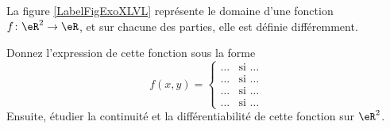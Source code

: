 
\begin{exercice}\label{exo0045}

La figure \ref{LabelFigExoXLVL} représente le domaine d'une fonction $f\colon \eR^2\to \eR$, et sur chacune des parties, elle est définie différemment.
\newcommand{\CaptionFigExoXLVL}{La fonction de l'exercice \ref{exo0045}.}


Donnez l'expression de cette fonction sous la forme
\begin{equation}
	f(x,y)=\begin{cases}
	\ldots	&	 \text{si \ldots}\\
	\ldots	&	 \text{si \ldots}\\
	\ldots	&	 \text{si \ldots}\\
	\ldots	&	 \text{si \ldots}
\end{cases}
\end{equation}
Ensuite, étudier la continuité et la différentiabilité de cette fonction sur $\eR^2$.

\end{exercice}
